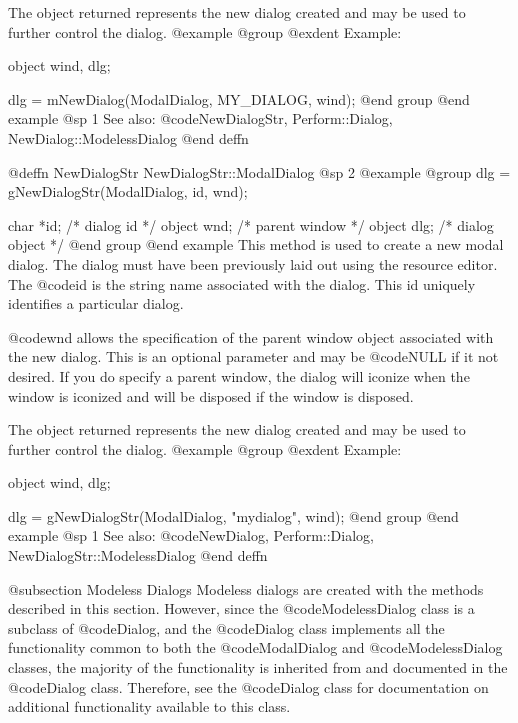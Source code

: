 The object returned represents the new dialog created and may be
used to further control the dialog.
@example
@group
@exdent Example:

object  wind, dlg;

dlg = mNewDialog(ModalDialog, MY_DIALOG, wind);
@end group
@end example
@sp 1
See also:  @code{NewDialogStr, Perform::Dialog, NewDialog::ModelessDialog}
@end deffn










@deffn {NewDialogStr} NewDialogStr::ModalDialog
@sp 2
@example
@group
dlg = gNewDialogStr(ModalDialog, id, wnd);

char      *id;  /*  dialog id      */
object    wnd;  /*  parent window  */
object    dlg;  /*  dialog object  */
@end group
@end example
This method is used to create a new modal dialog.  The dialog must have
been previously laid out using the resource editor.  The @code{id} is
the string name associated with the dialog.  This id uniquely identifies
a particular dialog.

@code{wnd} allows the specification of the parent window object associated
with the new dialog.  This is an optional parameter and may be @code{NULL}
if it not desired.  If you do specify a parent window, the dialog will
iconize when the window is iconized and will be disposed if the window
is disposed.

The object returned represents the new dialog created and may be
used to further control the dialog.
@example
@group
@exdent Example:

object  wind, dlg;

dlg = gNewDialogStr(ModalDialog, "mydialog", wind);
@end group
@end example
@sp 1
See also:  @code{NewDialog, Perform::Dialog, NewDialogStr::ModelessDialog}
@end deffn









@subsection Modeless Dialogs
Modeless dialogs are created with the methods described in this section.
However, since the @code{ModelessDialog} class is a subclass of
@code{Dialog}, and the @code{Dialog} class implements all the
functionality common to both the @code{ModalDialog} and
@code{ModelessDialog} classes, the majority of the functionality is
inherited from and documented in the @code{Dialog} class.  Therefore,
see the @code{Dialog} class for documentation on additional
functionality available to this class.





